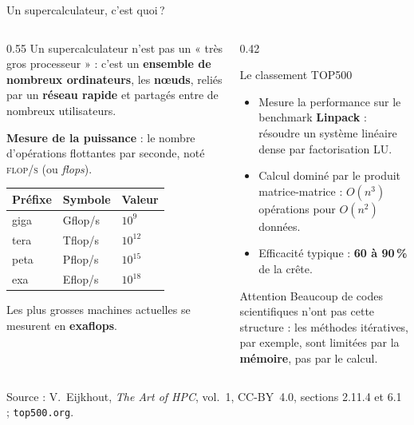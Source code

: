 \documentclass[8pt,aspectratio=169]{beamer}
\newcommand{\src}[1]{\vfill{\tiny\color{gray}Source : #1\par}}
\newcommand{\eij}{V.~Eijkhout, \emph{The Art of HPC}, vol.~1, CC-BY~4.0}
\newcommand{\flops}{\textsc{flop/s}}
\begin{document}
\begin{frame}{Un supercalculateur, c'est quoi\,?}
\begin{columns}[T]
\begin{column}{0.55\textwidth}
Un supercalculateur n'est pas un « très gros processeur » : c'est un \textbf{ensemble de nombreux ordinateurs}, les \textbf{nœuds}, reliés par un \textbf{réseau rapide} et partagés entre de nombreux utilisateurs.

\medskip
\textbf{Mesure de la puissance} : le nombre d'opérations flottantes par seconde, noté \flops{} (ou \emph{flops}).

\medskip
\begin{tabular}{@{}lll@{}}
\toprule
Préfixe & Symbole & Valeur\\
\midrule
giga & Gflop/s & $10^{9}$\\
tera & Tflop/s & $10^{12}$\\
peta & Pflop/s & $10^{15}$\\
exa  & Eflop/s & $10^{18}$\\
\bottomrule
\end{tabular}

\medskip
Les plus grosses machines actuelles se mesurent en \textbf{exaflops}.
\end{column}
\begin{column}{0.42\textwidth}
\begin{block}{Le classement TOP500}
\begin{itemize}
\item Mesure la performance sur le benchmark \textbf{Linpack} : résoudre un système linéaire dense par factorisation LU.
\item Calcul dominé par le produit matrice-matrice : $O(n^3)$ opérations pour $O(n^2)$ données.
\item Efficacité typique : \textbf{60 à 90\,\%} de la crête.
\end{itemize}
\end{block}
\begin{alertblock}{Attention}
Beaucoup de codes scientifiques n'ont pas cette structure : les méthodes itératives, par exemple, sont limitées par la \textbf{mémoire}, pas par le calcul.
\end{alertblock}
\end{column}
\end{columns}
\src{\eij{}, sections 2.11.4 et 6.1 ; \texttt{top500.org}.}
\end{frame}
\end{document}
